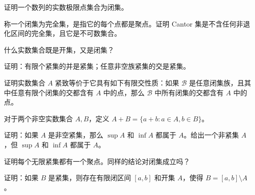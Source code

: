 \noindent\begin{minipage}{\textwidth}
证明一个数列的实数极限点集合为闭集。
\end{minipage}\par\vfill
\noindent\begin{minipage}{\textwidth}
称一个闭集为完全集，是指它的每个点都是聚点。证明 Cantor 集是不含任何非退化区间的完全集，且它是不可数集合。
\end{minipage}\par\vfill
\noindent\begin{minipage}{\textwidth}
什么实数集合既是开集，又是闭集？
\end{minipage}\par\vfill
\newpage
\noindent\begin{minipage}{\textwidth}
证明：有限个紧集的并是紧集；任意非空族紧集的交是紧集。
\end{minipage}\par\vfill
\noindent\begin{minipage}{\textwidth}
证明实数集合 $A$ 紧致等价于它具有如下有限交性质：如果 $\mathcal B$ 是任意闭集族，且其中任意有限个闭集的交都含有 $A$ 中的点，那么 $\mathcal B$ 中所有闭集的交都含有 $A$ 中的点。
\end{minipage}\par\vfill
\noindent\begin{minipage}{\textwidth}
对于两个非空实数集合 $A,B$，定义 $A+B=\{a+b:a\in A,b\in B\}$。
\end{minipage}\par\vfill
\noindent\begin{minipage}{\textwidth}
证明：如果 $A$ 是非空紧集，那么 $\sup A$ 和 $\inf A$ 都属于 $A$。给出一个非紧集 $A$，但 $\sup A$ 和 $\inf A$ 都属于 $A$。
\end{minipage}\par\vfill
\newpage
\noindent\begin{minipage}{\textwidth}
证明每个无限紧集都有一个聚点。同样的结论对闭集成立吗？
\end{minipage}\par\vfill
\noindent\begin{minipage}{\textwidth}
证明：如果 $B$ 是紧集，则存在有限闭区间 $[a,b]$ 和开集 $A$，使得 $B=[a,b]\setminus A$。
\end{minipage}\par\vfill
